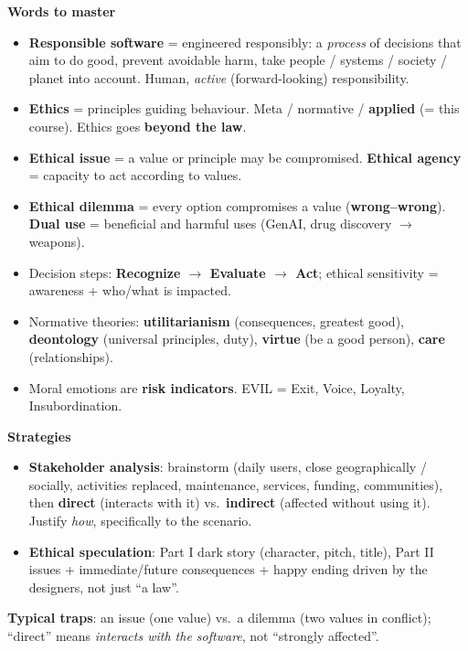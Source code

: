 \documentclass[11pt,a4paper,openany]{book}
\begin{document}
\begin{recapbox}[title={Exam-ready recap --- Introduction}]
\textbf{Words to master}
\begin{itemize}
  \item \textbf{Responsible software} = engineered responsibly: a \emph{process} of decisions
        that aim to do good, prevent avoidable harm, take people / systems / society / planet
        into account. Human, \emph{active} (forward-looking) responsibility.
  \item \textbf{Ethics} = principles guiding behaviour. Meta / normative / \textbf{applied}
        (= this course). Ethics goes \textbf{beyond the law}.
  \item \textbf{Ethical issue} = a value or principle may be compromised. \textbf{Ethical
        agency} = capacity to act according to values.
  \item \textbf{Ethical dilemma} = every option compromises a value (\textbf{wrong--wrong}).
        \textbf{Dual use} = beneficial and harmful uses (GenAI, drug discovery $\to$ weapons).
  \item Decision steps: \textbf{Recognize $\to$ Evaluate $\to$ Act}; ethical sensitivity =
        awareness + who/what is impacted.
  \item Normative theories: \textbf{utilitarianism} (consequences, greatest good),
        \textbf{deontology} (universal principles, duty), \textbf{virtue} (be a good person),
        \textbf{care} (relationships).
  \item Moral emotions are \textbf{risk indicators}. EVIL = Exit, Voice, Loyalty,
        Insubordination.
\end{itemize}
\textbf{Strategies}
\begin{itemize}
  \item \textbf{Stakeholder analysis}: brainstorm (daily users, close geographically /
        socially, activities replaced, maintenance, services, funding, communities), then
        \textbf{direct} (interacts with it) vs.\ \textbf{indirect} (affected without using it).
        Justify \emph{how}, specifically to the scenario.
  \item \textbf{Ethical speculation}: Part I dark story (character, pitch, title), Part II
        issues + immediate/future consequences + happy ending driven by the designers, not just
        ``a law''.
\end{itemize}
\textbf{Typical traps}: an issue (one value) vs.\ a dilemma (two values in conflict); ``direct''
means \emph{interacts with the software}, not ``strongly affected''.
\end{recapbox}
\end{document}
